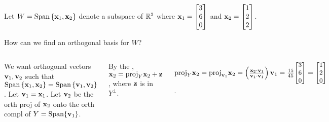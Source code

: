 \documentclass[xcolor=dvipsnames,aspectratio=169,t]{beamer}
\begin{document}
\begin{frame}
  Let $W  = \mbox{Span} \left\{ \mathbf{x}_1,\mathbf{x}_2 \right\}$ denote a subspace of $\mathbb{R}^3$ where
  $\mathbf{x}_1 = \begin{bmatrix} 3 \\ 6 \\ 0 \end{bmatrix}$ and
  $\mathbf{x}_2 = \begin{bmatrix} 1 \\ 2 \\ 2 \end{bmatrix}$.
  \vspace*{-.75em}
  
  How can we find an \alert{orthogonal basis} for $W$?
  \medskip

  \pause
  \begin{columns}[T]
  \column{0.19\tw}

  \column{0.81\tw}
  We want orthogonal vectors $\mathbf{v}_1,\mathbf{v}_2$ such that
    $\mbox{Span} \left\{ \mathbf{x}_1,\mathbf{x}_2 \right\} = \mbox{Span} \left\{ \mathbf{v}_1,\mathbf{v}_2 \right\}$.
  \bi
  \ii Let $\mathbf{v}_1 = \mathbf{x}_1$.
  \pause
  \ii Let $\mathbf{v}_2$ be the orth proj of $\mathbf{x}_2$ onto the orth compl of $Y=\mbox{Span}\{\mathbf{v}_1\}$.
  \smallskip
  
  By the , $\mathbf{x}_2 = \mbox{proj}_Y \mathbf{x}_2 + \mathbf{z}$, where $\mathbf{z}$ is in $Y^\perp$.
  
  \hspace*{7em} $\mbox{proj}_Y \mathbf{x}_2 = \mbox{proj}_{\mathbf{v}_1} \mathbf{x}_2 =  \left( \frac{ \mathbf{x}_2 \cdot \mathbf{v}_1}{\mathbf{v}_1 \cdot \mathbf{v}_1} \right) \mathbf{v}_1 = \frac{15}{45} {\small \begin{bmatrix} 3 \\ 6 \\ 0 \end{bmatrix} }= 
  {\small \begin{bmatrix} 1 \\ 2 \\ 0 \end{bmatrix}}$.
  \vspace*{-1em}
  

\end{columns}
\end{frame}
\end{document}
